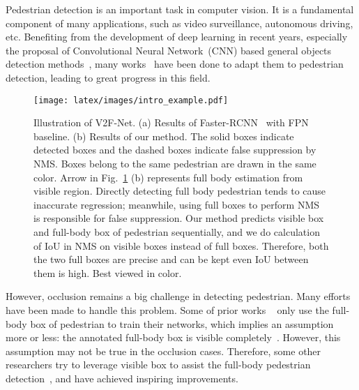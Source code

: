 \documentclass[10pt,twocolumn,letterpaper]{article}
\begin{document}
Pedestrian detection is an important task in computer vision. It is a  fundamental component of many applications, such as video surveillance, autonomous driving, etc. Benefiting from the development of deep learning in recent years, especially the proposal of Convolutional Neural Network~(CNN) based general objects detection methods~\cite{girshick2014rich,ren2015faster,he2017mask,yolov3,liu2016ssd,dai2016rfcn,lin2017feature,lin2017focal,cai2019cascadercnn}, many works~\cite{optimizedpedestrian,tian2015deep,stewart2016end,zhou2017multilabelpart,discriminativeoccluding,Tang2014,chi2019pedhunter} have been done to adapt them to pedestrian detection, leading to great progress in this field.

\begin{figure}[!t]
\begin{center}
 \texttt{[image: latex/images/intro\_example.pdf]}
\end{center}
   \caption{Illustration of V2F-Net. (a) Results of Faster-RCNN~\cite{ren2015faster} with FPN~\cite{lin2017feature} baseline. (b) Results of our method. The solid boxes indicate detected boxes and the dashed boxes indicate false suppression by NMS. Boxes belong to the same pedestrian are drawn in the same color. Arrow in Fig.~\ref{fig:illustration} (b) represents full body estimation from visible region. Directly detecting full body pedestrian tends to cause inaccurate regression; meanwhile, using full boxes to perform NMS is responsible for false suppression. Our method predicts visible box and full-body box of pedestrian sequentially, and we do calculation of IoU in NMS on visible boxes instead of full boxes. Therefore, both the two full boxes are precise and can be kept even IoU between them is high. Best viewed in color.}
\label{fig:illustration}
\end{figure}

However, occlusion remains a big challenge in detecting pedestrian. Many efforts have been made to handle this problem. Some of prior works ~\cite{wang2018repulsion,discriminativeoccluding,chu2020crowddet} only use the full-body box of pedestrian to train their networks, which implies an assumption more or less: the annotated full-body box is visible completely~\cite{pang2019mask}. However, this assumption may not be true in the occlusion cases. Therefore, some other researchers try to leverage visible box to assist the full-body pedestrian detection~\cite{pang2019mask,zhang2018Occlusionaware,Zhou_2018_bibox,zhang2018occludedattention,pang2019mask,huang2020R2nms}, and have achieved inspiring improvements.  
\end{document}
